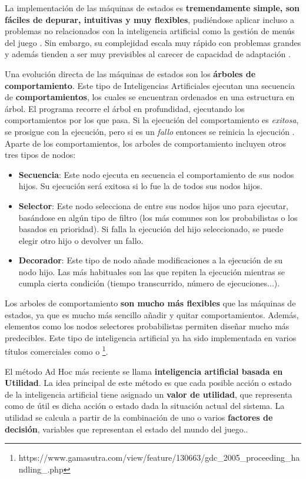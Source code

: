 La implementación de las máquinas de estados es \textbf{tremendamente simple, son fáciles de depurar, intuitivas y muy flexibles}, pudiéndose aplicar incluso a problemas no relacionados con la inteligencia artificial como la gestión de menús del juego \cite{libro_esi}. Sin embargo, su complejidad escala muy rápido con problemas grandes y además tienden a ser muy previsibles al carecer de capacidad de adaptación \cite{ai_and_games}.

Una evolución directa de las máquinas de estados son los \textbf{árboles de comportamiento}. Este tipo de Inteligencias Artificiales ejecutan una secuencia de \textbf{comportamientos}, los cuales se encuentran ordenados en una estructura en árbol. El programa recorre el árbol en profundidad, ejecutando los comportamientos por los que pasa. Si la ejecución del comportamiento es \textit{exitosa}, se prosigue con la ejecución, pero si es un \textit{fallo} entonces se reinicia la ejecución \cite{ai_and_games}. Aparte de los comportamientos, los arboles de comportamiento incluyen otros tres tipos de nodos:
\begin{itemize}
\item \textbf{Secuencia}: Este nodo ejecuta en secuencia el comportamiento de sus nodos hijos. Su ejecución será exitosa si lo fue la de todos sus nodos hijos.
\item \textbf{Selector}: Este nodo selecciona de entre sus nodos hijos uno para ejecutar, basándose en algún tipo de filtro (los más comunes son los probabilistas o los basados en prioridad). Si falla la ejecución del hijo seleccionado, se puede elegir otro hijo o devolver un fallo.
\item \textbf{Decorador}: Este tipo de nodo añade modificaciones a la ejecución de su nodo hijo. Las más habituales son las que repiten la ejecución mientras se cumpla cierta condición (tiempo transcurrido, número de ejecuciones...).
\end{itemize}

Los arboles de comportamiento \textbf{son mucho más flexibles} que las máquinas de estados, ya que es mucho más sencillo añadir y quitar comportamientos. Además, elementos como los nodos selectores probabilistas permiten diseñar mucho más predecibles. Este tipo de inteligencia artificial ya ha sido implementada en varios títulos comerciales como  o \footnote{https://www.gamasutra.com/view/feature/130663/gdc\_2005\_proceeding\_handling\_.php}.

El método Ad Hoc más reciente se llama \textbf{inteligencia artificial basada en Utilidad}. La idea principal de este método es que cada posible acción o estado de la inteligencia artificial tiene asignado un \textbf{valor de utilidad}, que representa como de útil es dicha acción o estado dada la situación actual del sistema. La utilidad se calcula a partir de la combinación de uno o varios \textbf{factores de decisión}, variables que representan el estado del mundo del juego.\cite{gameaipro}.

